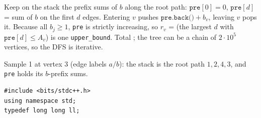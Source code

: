 \begin{solutionbox}
Keep on the stack the prefix sums of $b$ along the root path: $\texttt{pre}[0] = 0$, $\texttt{pre}[d]$ = sum of $b$ on the first $d$ edges. Entering $v$ pushes $\texttt{pre.back()} + b_v$, leaving $v$ pops it. Because all $b_j \ge 1$, \texttt{pre} is strictly increasing, so $r_v$ = (the largest $d$ with $\texttt{pre}[d] \le A_v$) is one \texttt{upper\_bound}. Total ; the tree can be a chain of $2\cdot10^5$ vertices, so the DFS is iterative.
\begin{center}
\end{center}
{\small Sample 1 at vertex 3 (edge labels $a / b$): the stack is the root path $1, 2, 4, 3$, and \texttt{pre} holds its $b$-prefix sums.}
\begin{lstlisting}[style=cpp]
#include <bits/stdc++.h>
using namespace std;
typedef long long ll;


\end{lstlisting}
\end{solutionbox}
